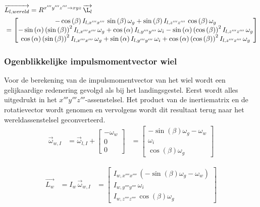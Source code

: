\begin{align*}
&\overrightarrow{L_{l,wereld}}=R^{x'''y'''z''' \rightarrow xyz}\,\overrightarrow{\L_{l}}\\
&=
\begin{bmatrix}
-\cos \left( \beta \right){ I_{l,x'''x'''}}\,\sin \left( \beta \right) \omega_{g}+\sin \left( \beta \right) {I_{l,z'''z'''}}\,\cos \left( \beta \right) \omega_{g}
\\ 
-\sin \left( \alpha \right)  \left( \sin \left( \beta \right)  \right) 
^{2}{ I_{l,x'''x'''}}\,\omega_{g}+\cos \left( \alpha \right) {I_{l,y'''y'''}}\,\omega_{i}-\sin \left( \alpha \right)  \left( \cos \left( 
\beta \right)  \right) ^{2}{I_{l,z'''z'''}} \,\omega_{g}
\\ 
\cos \left( \alpha \right)  \left( \sin \left( \beta \right)  \right) ^{2}{I_{l,x'''x'''}}\,\omega_{g}+\sin \left( \alpha \right) {I_{l,y'''y'''}}\,\omega_{i}+\cos \left( \alpha \right) \left( \cos \left( \beta \right)  \right) ^{2}{I_{l,z'''z'''}}\,\omega_
{g}
\end{bmatrix}
\end{align*}

\subsubsection{Ogenblikkelijke impulsmomentvector wiel}
Voor de berekening van de impulsmomentvector van het wiel wordt een gelijkaardige redenering gevolgd als bij het landingsgestel. Eerst wordt alles uitgedrukt in het $x'''y'''z'''$-assenstelsel. Het product van de inertiematrix en de rotatievector wordt genomen en vervolgens wordt dit resultaat terug naar het wereldassenstelsel geconverteerd.
\begin{equation*}
\begin{split}
\overrightarrow{\omega}_{w,I}
&=\overrightarrow{\omega}_{l,I}+
\begin{bmatrix}
-\omega_{w}\\
0\\
0\
\end{bmatrix}
&=\begin{bmatrix}
-\sin \left( \beta \right) \omega_{g}-\omega
_{w}\\
\omega_{i}\\
\cos \left( 
\beta \right) \omega_{g}\
\end{bmatrix}
\end{split}
\end{equation*}

\begin{equation}
\begin{split}
\overrightarrow{L_{w}}&=I_{w}\,\overrightarrow{\omega}_{w,I}&=
\begin{bmatrix}
{I_{w,x''''x''''}}\, \left( -\sin \left( \beta
 \right) \omega_{g}-\omega_{w} \right) \\
{I_{w,y''''y''''}}\,\omega_{i}\\
{I_{w,z''''z''''}}\,\cos \left( 
\beta \right) \omega_{g}\
\end{bmatrix}
\end{split}
\end{equation}


